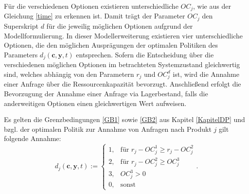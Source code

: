 Für die verschiedenen Optionen existieren unterschiedliche $OC_{j}$, wie aus der Gleichung \eqref{time} zu erkennen ist. Damit trägt der Parameter $OC_{j}$ den Superskript $d$ für die jeweilig möglichen Optionen aufgrund der Modellformulierung. In dieser Modellerweiterung existieren vier unterschiedliche Optionen, die den möglichen Ausprägungen der optimalen Politiken des Parameters $d_{j}(\textbf{c},\textbf{y},t)$ entsprechen. Sofern die Entscheidung über die verschiedenen möglichen Optionen im betrachteten Systemzustand gleichwertig sind, welches abhängig von den Parametern $r_{j}$ und $OC_j^{d}$ ist, wird die Annahme einer Anfrage über die Ressourcenkapazität bevorzugt. Anschließend erfolgt die Bevorzugung der Annahme einer Anfrage via Lagerbestand, falls die anderweitigen Optionen einen gleichwertigen Wert aufweisen.

Es gelten die Grenzbedingungen \eqref{GB1} sowie \eqref{GB2} aus Kapitel \ref{KapitelDP} und bzgl. der optimalen Politik zur Annahme von Anfragen nach Produkt $j$ gilt folgende Annahme:
\begin{equation}\label{GB4}
     d_{j}({\textbf{c},\textbf{y}, t}):=\left\{\begin{array}{llll}
     1, & \text{für } r_{j} - OC_{j}^{1} \ge r_{j} - OC_{j}^{2}\\
         2, & \text{für } r_{j} - OC_{j}^{2} \ge OC_{j}^{3}\\
         3, & OC_{j}^{3} > 0\\
         0, & \text{sonst}\end{array}\right. .
\end{equation}

